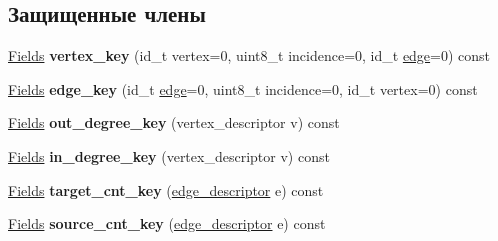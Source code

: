 \subsection*{Защищенные члены}
\begin{DoxyCompactItemize}
\item 
\mbox{\label{class_s_p_u___g_r_a_p_h_1_1_spu_ultra_graph_a82de737110404734e13195c78c00ec04}} 
\hyperlink{class_s_p_u_1_1_fields}{Fields} {\bfseries vertex\+\_\+key} (id\+\_\+t vertex=0, uint8\+\_\+t incidence=0, id\+\_\+t \hyperlink{class_s_p_u___g_r_a_p_h_1_1_spu_ultra_graph_a51468aa2278d3abb0c338ffbeac7747a}{edge}=0) const
\item 
\mbox{\label{class_s_p_u___g_r_a_p_h_1_1_spu_ultra_graph_ad38ed0654546e116eda62960688ab014}} 
\hyperlink{class_s_p_u_1_1_fields}{Fields} {\bfseries edge\+\_\+key} (id\+\_\+t \hyperlink{class_s_p_u___g_r_a_p_h_1_1_spu_ultra_graph_a51468aa2278d3abb0c338ffbeac7747a}{edge}=0, uint8\+\_\+t incidence=0, id\+\_\+t vertex=0) const
\item 
\mbox{\label{class_s_p_u___g_r_a_p_h_1_1_spu_ultra_graph_a878dcbdf2ab86bae044145e890b5fb29}} 
\hyperlink{class_s_p_u_1_1_fields}{Fields} {\bfseries out\+\_\+degree\+\_\+key} (vertex\+\_\+descriptor v) const
\item 
\mbox{\label{class_s_p_u___g_r_a_p_h_1_1_spu_ultra_graph_acf8c23a3fa97c2a426dd9ec551197cea}} 
\hyperlink{class_s_p_u_1_1_fields}{Fields} {\bfseries in\+\_\+degree\+\_\+key} (vertex\+\_\+descriptor v) const
\item 
\mbox{\label{class_s_p_u___g_r_a_p_h_1_1_spu_ultra_graph_aee27272166a6ffb584dea3409751ae40}} 
\hyperlink{class_s_p_u_1_1_fields}{Fields} {\bfseries target\+\_\+cnt\+\_\+key} (\hyperlink{class_s_p_u___g_r_a_p_h_1_1_spu_ultra_graph_a5f3776e003ef0a1648f1d9f84289810b}{edge\+\_\+descriptor} e) const
\item 
\mbox{\label{class_s_p_u___g_r_a_p_h_1_1_spu_ultra_graph_a8cbcd4e0e830f2d6b39965d111a74123}} 
\hyperlink{class_s_p_u_1_1_fields}{Fields} {\bfseries source\+\_\+cnt\+\_\+key} (\hyperlink{class_s_p_u___g_r_a_p_h_1_1_spu_ultra_graph_a5f3776e003ef0a1648f1d9f84289810b}{edge\+\_\+descriptor} e) const

\end{DoxyCompactItemize}
